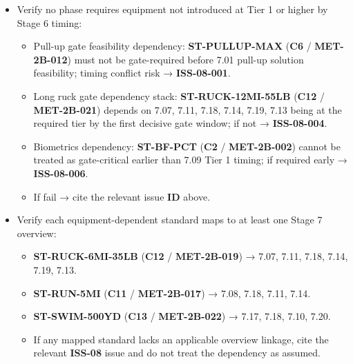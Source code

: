 \documentclass[10pt]{article}
\begin{document}
\begin{itemize}
\item Verify no phase requires equipment not introduced at Tier 1 or higher by Stage 6 timing:
  \begin{itemize}
  \item Pull-up gate feasibility dependency: \textbf{ST-PULLUP-MAX} (\textbf{C6} / \textbf{MET-2B-012}) must not be gate-required before 7.01 pull-up solution feasibility; timing conflict risk → \textbf{ISS-08-001}.
  \item Long ruck gate dependency stack: \textbf{ST-RUCK-12MI-55LB} (\textbf{C12} / \textbf{MET-2B-021}) depends on 7.07, 7.11, 7.18, 7.14, 7.19, 7.13 being at the required tier by the first decisive gate window; if not → \textbf{ISS-08-004}.
  \item Biometrics dependency: \textbf{ST-BF-PCT} (\textbf{C2} / \textbf{MET-2B-002}) cannot be treated as gate-critical earlier than 7.09 Tier 1 timing; if required early → \textbf{ISS-08-006}.
  \item If fail → cite the relevant issue \textbf{ID} above.
  \end{itemize}

\item Verify each equipment-dependent standard maps to at least one Stage 7 overview:
  \begin{itemize}
  \item \textbf{ST-RUCK-6MI-35LB} (\textbf{C12} / \textbf{MET-2B-019}) → 7.07, 7.11, 7.18, 7.14, 7.19, 7.13.
  \item \textbf{ST-RUN-5MI} (\textbf{C11} / \textbf{MET-2B-017}) → 7.08, 7.18, 7.11, 7.14.
  \item \textbf{ST-SWIM-500YD} (\textbf{C13} / \textbf{MET-2B-022}) → 7.17, 7.18, 7.10, 7.20.
  \item If any mapped standard lacks an applicable overview linkage, cite the relevant \textbf{ISS-08} issue and do not treat the dependency as assumed.
  \end{itemize}


\end{itemize}
\end{document}
